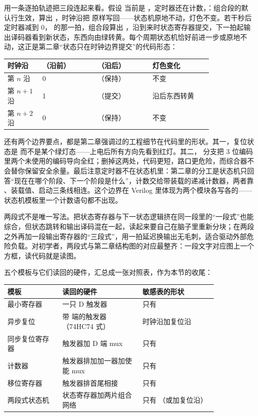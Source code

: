 用一条逐拍轨迹把三段连起来看。假设  当前是 ，定时器还在计数，：组合段的默认行生效，算出 ，时钟沿把  原样写回——状态机原地不动，灯色不变。若干秒后定时器减到 0， 的那一拍，组合段算出 ，沿到来时状态寄存器提交，下一拍起输出译码器看到新状态，东西向由绿转黄。每个周期状态机恰好前进一步或原地不动，这正是第二章“状态只在时钟边界提交”的代码形态：

\begin{longtable}{L{0.14\linewidth}L{0.22\linewidth}L{0.22\linewidth}L{0.24\linewidth}}
\toprule
时钟沿 & （沿前） & （沿后） & 灯色变化 \\
\midrule
第 $n$ 沿 & 0 & （保持） & 不变 \\
第 $n+1$ 沿 & 1 & （提交） & 沿后东西转黄 \\
第 $n+2$ 沿 & 0 & （保持） & 不变 \\
\bottomrule
\end{longtable}

还有两个边界要点，都是第二章强调过的工程细节在代码里的形状。其一，复位状态是  而不是某个绿灯态——上电后所有方向先看到红灯。其二， 分支把 3 位编码里两个未使用的编码导向全红；删掉这两处，代码更短，路口更危险，而综合器不会替你保留安全余量。最后注意定时器不在状态机里：第二章的分工是状态机只回答“现在在哪个阶段、下一个阶段是什么”，计数交给带装载的递减计数器，两者靠 、装载值、启动三条线相连。这个边界在 Verilog 里体现为两个模块各写各的——状态机模板里一个计数语句都不出现。

两段式不是唯一写法。把状态寄存器与下一状态逻辑挤在同一段里的“一段式”也能综合，但状态跳转和输出译码混在一起，读起来要自己在脑子里重新分块；在两段之外再加一段输出寄存器的“三段式”，用一拍延迟换输出无毛刺，适合驱动外部危险负载。对初学者，两段式与第二章结构图的对应最整齐：一段文字对应图上一个方框，读代码就是读图。

五个模板与它们读回的硬件，汇总成一张对照表，作为本节的收尾：

\begin{longtable}{L{0.22\linewidth}L{0.32\linewidth}L{0.30\linewidth}}
\toprule
模板 & 读回的硬件 & 敏感表的形状 \\
\midrule
最小寄存器 & 一只 D 触发器 & 只有  \\
异步复位 & 带  端的触发器（74HC74 式） & 时钟沿加复位沿 \\
同步复位寄存器 & 触发器加 D 端 mux & 只有  \\
计数器 & 触发器排加加一器加使能 mux & 只有  \\
移位寄存器 & 触发器排首尾相接 & 只有  \\
两段式状态机 & 状态寄存器加两片组合网络 & 只有 （或加复位沿） \\
\bottomrule
\end{longtable}


